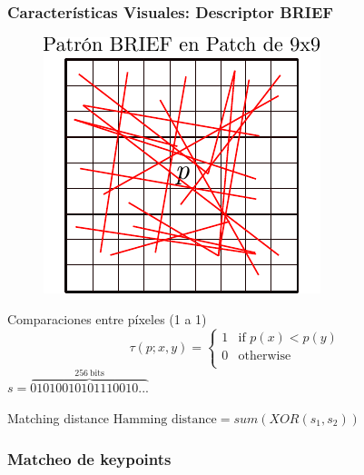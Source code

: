 \begin{frame}
	\frametitle{Características Visuales: Descriptor BRIEF}
	\begin{minipage}[t]{0.35\columnwidth}
		\begin{figure}
			\includegraphics[width=\columnwidth]{./images/camera/brief}
		\end{figure}
	\end{minipage}\hfill{}
	\begin{minipage}[t]{0.6\columnwidth}
		 Comparaciones entre píxeles (1 a 1)
		\begin{equation*}
			\tau(p;x,y) =
			\begin{cases}
				1 & \text{if $p(x) < p(y)$}\\
				0 & \text{otherwise}\\
			\end{cases}     
		\end{equation*}
		$s = \overbrace{01010010101110010...}^{256\ \text{bits}}$
	\end{minipage}
	\begin{block}{Matching distance}
		$\text{Hamming distance} = sum (XOR(s_{1}, s_{2}))$
	\end{block}
\end{frame}

\begin{frame}
	\frametitle{Matcheo de keypoints}
	\footnotesize
	
\end{frame}

